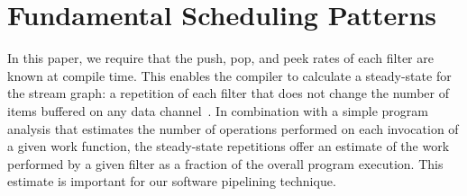 \section{Fundamental Scheduling Patterns}

In this paper, we require that the push, pop, and peek rates of each
filter are known at compile time.  This enables the compiler to
calculate a steady-state for the stream graph: a repetition of each
filter that does not change the number of items buffered on any data
channel~\cite{lee87,karczmarek:lctes:2003}. In combination with a
simple program analysis that estimates the number of operations
performed on each invocation of a given work function, the
steady-state repetitions offer an estimate of the work performed by a
given filter as a fraction of the overall program execution.  This
estimate is important for our software pipelining technique.
